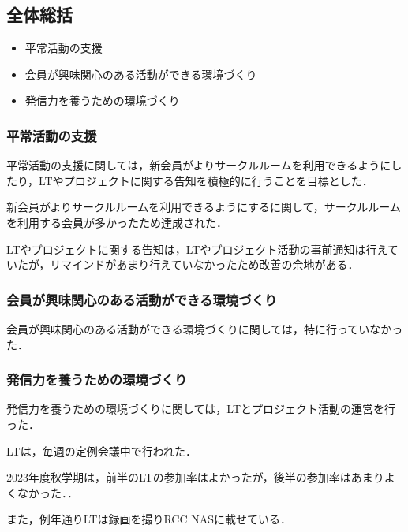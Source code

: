 \subsection*{全体総括}


\begin{itemize}
    \item 平常活動の支援
    \item 会員が興味関心のある活動ができる環境づくり
    \item 発信力を養うための環境づくり
  \end{itemize}
  
  \subsubsection*{平常活動の支援}
  平常活動の支援に関しては，新会員がよりサークルルームを利用できるようにしたり，LTやプロジェクトに関する告知を積極的に行うことを目標とした．

  新会員がよりサークルルームを利用できるようにするに関して，サークルルームを利用する会員が多かったため達成された．

  LTやプロジェクトに関する告知は，LTやプロジェクト活動の事前通知は行えていたが，リマインドがあまり行えていなかったため改善の余地がある．
  
  \subsubsection*{会員が興味関心のある活動ができる環境づくり}
  会員が興味関心のある活動ができる環境づくりに関しては，特に行っていなかった．
  
  \subsubsection*{発信力を養うための環境づくり}
  発信力を養うための環境づくりに関しては，LTとプロジェクト活動の運営を行った．
  
  LTは，毎週の定例会議中で行われた．
  
  2023年度秋学期は，前半のLTの参加率はよかったが，後半の参加率はあまりよくなかった．．
  
  また，例年通りLTは録画を撮りRCC NASに載せている．
  